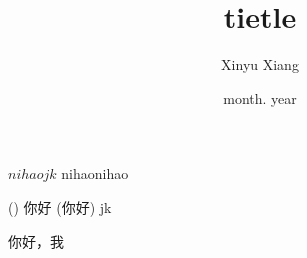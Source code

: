 \documentclass[14pt]{extarticle}
\title{\textbf{tietle}}
\author{Xinyu Xiang}
\date{month. year}
\begin{document}
\maketitle

$nihaojk$ nihaonihao

() 你好 (你好)
jk

你好，我

\begin{equation*}

\end{equation*}
\end{document}
